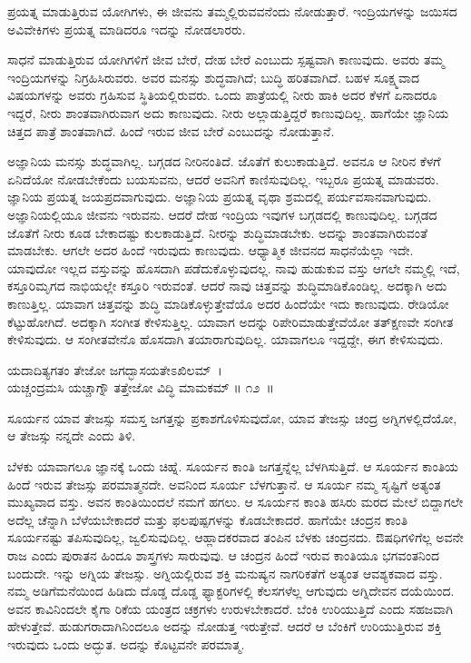 \begin{artha}
ಪ್ರಯತ್ನ ಮಾಡುತ್ತಿರುವ ಯೋಗಿಗಳು, ಈ ಜೀವನು ತಮ್ಮಲ್ಲಿರುವವನೆಂದು ನೋಡುತ್ತಾರೆ. ಇಂದ್ರಿಯಗಳನ್ನು ಜಯಿಸದ ಅವಿವೇಕಿಗಳು ಪ್ರಯತ್ನ ಮಾಡಿದರೂ ಇದನ್ನು ನೋಡಲಾರರು.
\end{artha}

\newpage

ಸಾಧನೆ ಮಾಡುತ್ತಿರುವ ಯೋಗಿಗಳಿಗೆ ಜೀವ ಬೇರೆ, ದೇಹ ಬೇರೆ ಎಂಬುದು ಸ್ಪಷ್ಟವಾಗಿ ಕಾಣುವುದು. ಅವರು ತಮ್ಮ ಇಂದ್ರಿಯಗಳನ್ನು ನಿಗ್ರಹಿಸಿರುವರು. ಅವರ ಮನಸ್ಸು ಶುದ್ಧವಾಗಿದೆ; ಬುದ್ಧಿ ಹರಿತವಾಗಿದೆ. ಬಹಳ ಸೂಕ್ಷ್ಮವಾದ ವಿಷಯಗಳನ್ನು ಅವರು ಗ್ರಹಿಸುವ ಸ್ಥಿತಿಯಲ್ಲಿರುವರು. ಒಂದು ಪಾತ್ರೆಯಲ್ಲಿ ನೀರು ಹಾಕಿ ಅದರ ಕೆಳಗೆ ಏನಾದರೂ ಇದ್ದರೆ, ನೀರು ಶಾಂತವಾಗಿರುವಾಗ ಅದು ಕಾಣುವುದು. ನೀರು ಅಲ್ಲಾಡುತ್ತಿದ್ದರೆ ಕಾಣುವುದಿಲ್ಲ. ಹಾಗೆಯೇ ಜ್ಞಾನಿಯ ಚಿತ್ತದ ಪಾತ್ರೆ ಶಾಂತವಾಗಿದೆ. ಹಿಂದೆ ಇರುವ ಜೀವ ಬೇರೆ ಎಂಬುದನ್ನು ನೋಡುತ್ತಾನೆ.

ಅಜ್ಞಾನಿಯ ಮನಸ್ಸು ಶುದ್ಧವಾಗಿಲ್ಲ. ಬಗ್ಗಡದ ನೀರಿನಂತಿದೆ. ಜೊತೆಗೆ ಕುಲುಕಾಡುತ್ತಿದೆ. ಅವನೂ ಆ ನೀರಿನ ಕೆಳಗೆ ಏನಿದೆಯೋ ನೋಡಬೇಕೆಂದು ಬಯಸುವನು, ಆದರೆ ಅವನಿಗೆ ಕಾಣಿಸುವುದಿಲ್ಲ. ಇಬ್ಬರೂ ಪ್ರಯತ್ನ ಮಾಡುವರು. ಜ್ಞಾನಿಯ ಪ್ರಯತ್ನ ಜಯಪ್ರದವಾಗುವುದು. ಅಜ್ಞಾನಿಯ ಪ್ರಯತ್ನ ವೃಥಾ ಶ್ರಮದಲ್ಲಿ ಪರ್ಯವಸಾನವಾಗುವುದು. ಅಜ್ಞಾನಿಯಲ್ಲಿಯೂ ಜೀವನು ಇರುವನು. ಆದರೆ ದೇಹ ಇಂದ್ರಿಯ ಇವುಗಳ ಬಗ್ಗಡದಲ್ಲಿ ಕಾಣುವುದಿಲ್ಲ. ಬಗ್ಗಡದ ಜೊತೆಗೆ ನೀರು ಕೂಡ ಬೇಕಾದಷ್ಟು ಕುಲಕಾಡುತ್ತಿದೆ. ನೀರನ್ನು ಶುದ್ಧಿಮಾಡಬೇಕು. ಅದನ್ನು ಶಾಂತವಾಗಿರುವಂತೆ ಮಾಡಬೇಕು. ಆಗಲೇ ಅದರ ಹಿಂದೆ ಇರುವುದು ಕಾಣುವುದು. ಆಧ್ಯಾತ್ಮಿಕ ಜೀವನದ ಸಾಧನೆಯೆಲ್ಲಾ ಇದೇ. ಯಾವುದೋ ಇಲ್ಲದ ವಸ್ತುವನ್ನು ಹೊಸದಾಗಿ ಪಡೆದು\-ಕೊಳ್ಳುವುದಲ್ಲ. ನಾವು ಹುಡುಕುವ ವಸ್ತು ಆಗಲೇ ನಮ್ಮಲ್ಲಿ ಇದೆ, ಕಸ್ತೂರಿಮೃಗದ ನಾಭಿಯಲ್ಲೇ ಕಸ್ತೂರಿ ಇರುವಂತೆ. ಆದರೆ ನಾವು ಚಿತ್ತವನ್ನು ಶುದ್ಧಿಮಾಡಿಕೊಂಡಿಲ್ಲ. ಅದಕ್ಕಾಗಿ ಅದು ಕಾಣುತ್ತಿಲ್ಲ. ಯಾವಾಗ ಚಿತ್ತವನ್ನು ಶುದ್ಧಿ ಮಾಡಿಕೊಳ್ಳುತ್ತೇವೆಯೊ ಅದರ ಹಿಂದೆಯೇ ಇದು ಕಾಣುವುದು. ರೇಡಿಯೋ ಕೆಟ್ಟುಹೋಗಿದೆ. ಅದಕ್ಕಾಗಿ ಸಂಗೀತ ಕೇಳಿಸುತ್ತಿಲ್ಲ. ಯಾವಾಗ ಅದನ್ನು ರಿಪೇರಿಮಾಡುತ್ತೇವೆಯೋ ತತ್​ಕ್ಷಣವೇ ಸಂಗೀತ ಕೇಳಿಸುವುದು. ಆ ಸಂಗೀತವೇನೊ ಹೊಸದಾಗಿ ತಯಾರಾಗುವುದಿಲ್ಲ. ಯಾವಾಗಲೂ ಇದ್ದದ್ದೇ, ಈಗ ಕೇಳಿಸುವುದು.

\begin{shloka}
ಯದಾದಿತ್ಯಗತಂ ತೇಜೋ ಜಗದ್ಭಾಸಯತೇಽಖಿಲಮ್~।\\ಯಚ್ಚಂದ್ರಮಸಿ ಯಚ್ಚಾಗ್ನೌ ತತ್ತೇಜೋ ವಿದ್ಧಿ ಮಾಮಕಮ್ \hfill॥ ೧೨~॥
\end{shloka}

\begin{artha}
ಸೂರ್ಯನ ಯಾವ ತೇಜಸ್ಸು ಸಮಸ್ತ ಜಗತ್ತನ್ನು ಪ್ರಕಾಶಗೊಳಿಸುವುದೋ, ಯಾವ ತೇಜಸ್ಸು ಚಂದ್ರ ಅಗ್ನಿಗಳಲ್ಲಿದೆಯೋ, ಆ ತೇಜಸ್ಸು ನನ್ನದೇ ಎಂದು ತಿಳಿ.
\end{artha}

ಬೆಳಕು ಯಾವಾಗಲೂ ಜ್ಞಾನಕ್ಕೆ ಒಂದು ಚಿಹ್ನೆ. ಸೂರ್ಯನ ಕಾಂತಿ ಜಗತ್ತನ್ನೆಲ್ಲ ಬೆಳಗಿಸುತ್ತಿದೆ. ಆ ಸೂರ್ಯನ ಕಾಂತಿಯ ಹಿಂದೆ ಇರುವ ತೇಜಸ್ಸು ಪರಮಾತ್ಮನದೇ. ಅವನಿಂದ ಸೂರ್ಯ ಬೆಳಗುತ್ತಾನೆ. ಆ ಸೂರ್ಯ ನಮ್ಮ ಸೃಷ್ಟಿಗೆ ಅತ್ಯಂತ ಮುಖ್ಯವಾದ ವಸ್ತು. ಅವನ ಕಾಂತಿಯಿಂದಲೆ ನಮಗೆ ಹಗಲು. ಆ ಸೂರ್ಯನ ಕಾಂತಿ ಹಸಿರು ಮರದ ಮೇಲೆ ಬಿದ್ದಾಗಲೇ ಅದೆಲ್ಲ ಚೆನ್ನಾಗಿ ಬೆಳೆಯಬೇಕಾದರೆ ಮತ್ತು ಫಲಪುಷ್ಪಗಳನ್ನು ಕೊಡಬೇಕಾದರೆ. ಹಾಗೆಯೇ ಚಂದ್ರನ ಕಾಂತಿ ಸೂರ್ಯನಷ್ಟು ತಪಿಸುವುದಿಲ್ಲ, ಜ್ವಲಿಸುವುದಿಲ್ಲ. ಆಹ್ಲಾದಕರವಾದ ತಂಪಿನ ಬೆಳಕು ಚಂದ್ರನದು. ಔಷಧಿಗಳಿಗೆಲ್ಲ ಅವನೇ ರಾಜ ಎಂದು ಪುರಾತನ ಹಿಂದೂ ಶಾಸ್ತ್ರಗಳು ಸಾರುವುವು. ಆ ಚಂದ್ರನ ಹಿಂದೆ ಇರುವ ಕಾಂತಿಯೂ ಭಗವಂತನಿಂದ ಬಂದುದೇ. ಇನ್ನು ಅಗ್ನಿಯ ತೇಜಸ್ಸು. ಅಗ್ನಿಯಲ್ಲಿ\-ರುವ ಶಕ್ತಿ ಮನುಷ್ಯನ ನಾಗರಿಕತೆಗೆ ಅತ್ಯಂತ ಆವಶ್ಯಕವಾದ ವಸ್ತು. ನಮ್ಮ ಅಡಿಗೆಮನೆಯಿಂದ ಹಿಡಿದು ದೊಡ್ಡ ದೊಡ್ಡ ಫ್ಯಾಕ್ಟರಿಗಳಲ್ಲಿ ಕೆಲಸಗಳೆಲ್ಲ ಆಗುವುದು ಅಗ್ನಿದೇವನ ದಯೆಯಿಂದ. ಅವನ ಕಾವಿನಿಂದಲೇ ಕೈಗಾ ರಿಕೆಯ ಯಂತ್ರದ ಚಕ್ರಗಳು ಉರುಳಬೇಕಾದರೆ. ಬೆಂಕಿ ಉರಿಯುತ್ತಿದೆ ಎಂದು ಸಹಜವಾಗಿ ಹೇಳುತ್ತೇವೆ. ಹುಡುಗರಾದಾಗಿನಿಂದಲೂ ಅದನ್ನು ನೋಡುತ್ತ ಇರುತ್ತೇವೆ. ಆದರೆ ಆ ಬೆಂಕಿಗೆ ಉರಿಯುತ್ತಿರುವ ಶಕ್ತಿ ಇರುವುದು ಒಂದು ಅದ್ಭುತ. ಅದನ್ನು ಕೊಟ್ಟವನೇ ಪರಮಾತ್ಮ.

